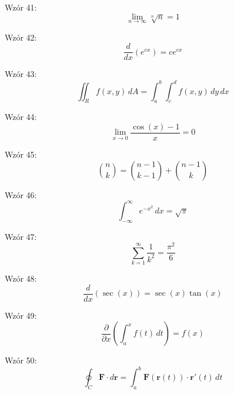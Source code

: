 \documentclass{article}
\begin{document}
Wzór 41:
\[ \lim_{{n \to \infty}} \sqrt[n]{n} = 1 \]

Wzór 42:
\[ \frac{d}{dx}\left(e^{cx}\right) = c e^{cx} \]

Wzór 43:
\[ \iint_R f(x,y) \,dA = \int_{a}^{b} \int_{c}^{d} f(x,y) \,dy\,dx \]

Wzór 44:
\[ \lim_{{x \to 0}} \frac{\cos(x) - 1}{x} = 0 \]

Wzór 45:
\[ \binom{n}{k} = \binom{n-1}{k-1} + \binom{n-1}{k} \]

Wzór 46:
\[ \int_{-\infty}^{\infty} e^{-x^2} \,dx = \sqrt{\pi} \]

Wzór 47:
\[ \sum_{k=1}^{\infty} \frac{1}{k^2} = \frac{\pi^2}{6} \]

Wzór 48:
\[ \frac{d}{dx}\left(\sec(x)\right) = \sec(x) \tan(x) \]

Wzór 49:
\[ \frac{\partial}{\partial x}\left(\int_{a}^{x} f(t) \,dt\right) = f(x) \]

Wzór 50:
\[ \oint_C \mathbf{F} \cdot d\mathbf{r} = \int_{a}^{b} \mathbf{F}(\mathbf{r}(t)) \cdot \mathbf{r}'(t) \,dt \]
\end{document}
